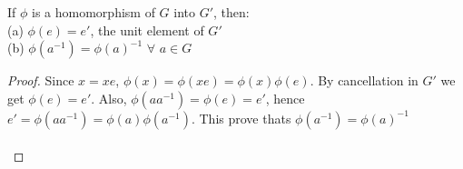 \documentclass[12pt]{article}
\newenvironment{lemma}[2][Lemma]{\begin{trivlist}
\item[\hskip \labelsep {\bfseries #1}\hskip \labelsep {\bfseries #2.}]}{\end{trivlist}}
\begin{document}
\begin{lemma}{2.5.2}
If $\phi$ is a homomorphism of $G$ into $G'$, then: \\ 
(a) $\phi (e) = e'$, the unit element of $G'$ \\ 
(b) $\phi (a^{-1}) = \phi(a)^{-1}$ $\forall$ $a \in G$
\end{lemma}

\begin{proof}
Since $x = xe$, $\phi(x) = \phi(xe) = \phi(x) \phi(e)$. By cancellation in $G'$ we get $\phi(e) = e'$. Also, $\phi(aa^{-1}) = \phi(e) = e'$, hence $e' = \phi(aa^{-1})= \phi(a)\phi(a^{-1})$. This prove thats $\phi(a^{-1}) = \phi(a)^{-1}$ \\ \\
\end{proof}





 
\end{document}
